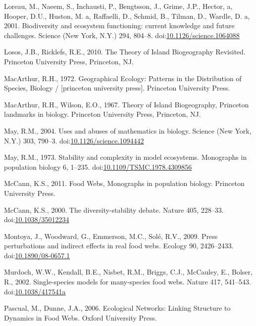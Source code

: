 \hypertarget{ref-Loreau2001}{}
Loreau, M., Naeem, S., Inchausti, P., Bengtsson, J., Grime, J.P.,
Hector, a, Hooper, D.U., Huston, M. a, Raffaelli, D., Schmid, B.,
Tilman, D., Wardle, D. a, 2001. Biodiversity and ecosystem functioning:
current knowledge and future challenges. Science (New York, N.Y.) 294,
804--8.
doi:\href{https://doi.org/10.1126/science.1064088}{10.1126/science.1064088}

\hypertarget{ref-Losos2010}{}
Losos, J.B., Ricklefs, R.E., 2010. The Theory of Island Biogeography
Revisited. Princeton University Press, Princeton, NJ.

\hypertarget{ref-macarthur1972geographical}{}
MacArthur, R.H., 1972. Geographical Ecology: Patterns in the
Distribution of Species, Biology / {[}princeton university press{]}.
Princeton University Press.

\hypertarget{ref-MacArthur1967}{}
MacArthur, R.H., Wilson, E.O., 1967. Theory of Island Biogeography,
Princeton landmarks in biology. Princeton University Press, Princeton,
NJ.

\hypertarget{ref-May2004}{}
May, R.M., 2004. Uses and abuses of mathematics in biology. Science (New
York, N.Y.) 303, 790--3.
doi:\href{https://doi.org/10.1126/science.1094442}{10.1126/science.1094442}

\hypertarget{ref-May1973}{}
May, R.M., 1973. Stability and complexity in model ecosystems.
Monographs in population biology 6, 1--235.
doi:\href{https://doi.org/10.1109/TSMC.1978.4309856}{10.1109/TSMC.1978.4309856}

\hypertarget{ref-mccann2011food}{}
McCann, K.S., 2011. Food Webs, Monographs in population biology.
Princeton University Press.

\hypertarget{ref-McCann2000}{}
McCann, K.S., 2000. The diversity-stability debate. Nature 405, 228--33.
doi:\href{https://doi.org/10.1038/35012234}{10.1038/35012234}

\hypertarget{ref-Montoya2009}{}
Montoya, J., Woodward, G., Emmerson, M.C., Solé, R.V., 2009. Press
perturbations and indirect effects in real food webs. Ecology 90,
2426--2433.
doi:\href{https://doi.org/10.1890/08-0657.1}{10.1890/08-0657.1}

\hypertarget{ref-Murdoch2002}{}
Murdoch, W.W., Kendall, B.E., Nisbet, R.M., Briggs, C.J., McCauley, E.,
Bolser, R., 2002. Single-species models for many-species food webs.
Nature 417, 541--543.
doi:\href{https://doi.org/10.1038/417541a}{10.1038/417541a}

\hypertarget{ref-Pascual2006}{}
Pascual, M., Dunne, J.A., 2006. Ecological Networks: Linking Structure
to Dynamics in Food Webs. Oxford University Press.

